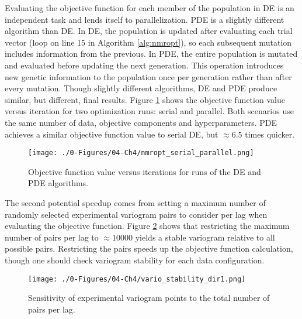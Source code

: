 Evaluating the objective function for each member of the population in \gls{DE} is an independent task and lends itself to parallelization. \gls{PDE} is a slightly different algorithm than \gls{DE}. In \gls{DE}, the population is updated after evaluating each trial vector (loop on line 15 in Algorithm \ref{alg:nmropt}), so each subsequent mutation includes information from the previous. In \gls{PDE}, the entire population is mutated and evaluated before updating the next generation. This operation introduces new genetic information to the population once per generation rather than after every mutation. Though slightly different algorithms, \gls{DE} and \gls{PDE} produce similar, but different, final results. Figure \ref{fig:nmropt_serial_parallel} shows the objective function value versus iteration for two optimization runs: serial and parallel. Both scenarios use the same number of data, objective components and hyperparameters. \Gls{PDE} achieves a similar objective function value to serial \gls{DE}, but $\approx 6.5$ times quicker.

\begin{figure}[htb!]
    \centering
    \texttt{[image: ./0-Figures/04-Ch4/nmropt\_serial\_parallel.png]}
    \caption{Objective function value versus iterations for runs of the \gls{DE} and \gls{PDE} algorithms.}
    \label{fig:nmropt_serial_parallel}
\end{figure}

The second potential speedup comes from setting a maximum number of randomly selected experimental variogram pairs to consider per lag when evaluating the objective function. Figure \ref{fig:vario_stability_dir1} shows that restricting the maximum number of pairs per lag to $\approx 10000$ yields a stable variogram relative to all possible pairs. Restricting the pairs speeds up the objective function calculation, though one should check variogram stability for each data configuration.

\begin{figure}[htb!]
    \centering
    \texttt{[image: ./0-Figures/04-Ch4/vario\_stability\_dir1.png]}
    \caption{Sensitivity of experimental variogram points to the total number of pairs per lag.}
    \label{fig:vario_stability_dir1}
\end{figure}


